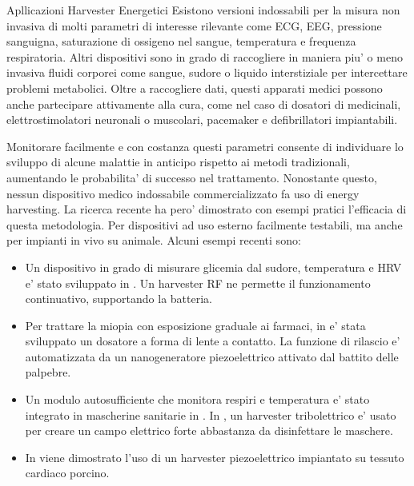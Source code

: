 \begin{section}{Apllicazioni Harvester Energetici}
    Esistono versioni indossabili per la misura non invasiva di molti parametri di interesse rilevante come ECG, EEG, pressione sanguigna, saturazione di ossigeno nel sangue, temperatura e frequenza respiratoria. Altri dispositivi sono in grado di raccogliere in maniera piu' o meno invasiva fluidi corporei come sangue, sudore o liquido interstiziale per intercettare problemi metabolici. Oltre a raccogliere dati, questi apparati medici possono anche partecipare attivamente alla cura, come nel caso di dosatori di medicinali, elettrostimolatori neuronali o muscolari, pacemaker e defibrillatori impiantabili.
    
    Monitorare facilmente e con costanza questi parametri consente di individuare lo sviluppo di alcune malattie in anticipo rispetto ai metodi tradizionali, aumentando le probabilita' di successo nel trattamento. Nonostante questo, nessun dispositivo medico indossabile commercializzato fa uso di energy harvesting. La ricerca recente ha pero' dimostrato con esempi pratici l'efficacia di questa metodologia. Per dispositivi ad uso esterno facilmente testabili, ma anche per impianti in vivo su animale. Alcuni esempi recenti sono: \begin{itemize}
        \item Un dispositivo in grado di misurare glicemia dal sudore, temperatura e HRV e' stato sviluppato in \cite{mirlouContinuousGlycemicMonitoring2024}. Un harvester RF ne permette il funzionamento continuativo, supportando la batteria.
        \item Per trattare la miopia con esposizione graduale ai farmaci, in \cite{jiangSelfgeneratedElectricitydrivenDrug2024} e' stata sviluppato un dosatore a forma di lente a contatto. La funzione di rilascio e' automatizzata da un nanogeneratore piezoelettrico attivato dal battito delle palpebre.
        \item Un modulo autosufficiente che monitora respiri e temperatura e' stato integrato in mascherine sanitarie in \cite{lanHighefficientIntelligentAntibacterial2024}. In \cite{simInstantDisinfectingFace}, un harvester tribolettrico e' usato per creare un campo elettrico forte abbastanza da disinfettare le maschere.
        \item In \cite{anVivoFlexibleEnergy2024} viene dimostrato l'uso di un harvester piezoelettrico impiantato su tessuto cardiaco porcino.
    \end{itemize}
 

\end{section}
